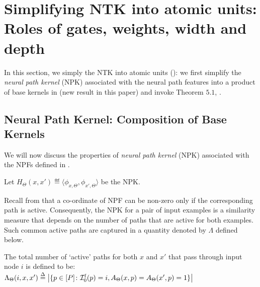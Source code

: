 \section{Simplifying NTK into atomic units: Roles of gates, weights, width and depth}\label{sec:fc}
In this section, we simply the NTK into atomic units (): we first simplify the \emph{neural path kernel} (NPK) associated with the neural path features into a product of base kernels in  (new result in this paper) and invoke {Theorem $5.1$}, \cite{npk}. 
\subsection{Neural Path Kernel: Composition of Base Kernels}
We will now discuss the properties of \emph{neural path kernel} (NPK) associated with the NPFs defined in .  
\begin{definition}
Let $H_{\Theta}(x,x')\eqdef\langle\phi_{x,\Theta},\phi_{x',\Theta} \rangle$ be the NPK.
\end{definition}

Recall from  that a co-ordinate of NPF can be non-zero only if the corresponding path is active. Consequently, the NPK for a pair of input examples is a similarity measure that depends on the number of paths that are active for both examples. Such common active paths are captured in a quantity denoted by $\Lambda$ defined below.
\begin{definition}\label{def:cnnlambda}
The total number of `active' paths for both $x$ and $x'$ that pass through input node $i$ is defined to be:
{$\Lambda_{\Theta}(i,x,x') \stackrel{\Delta}{=} \left|\{p\in[P]\colon  \mathcal{I}^{\text{f}}_0(p)=i, A_{\Theta}(x,p)= A_{\Theta}(x',p)=1\}\right|$}
\end{definition}
